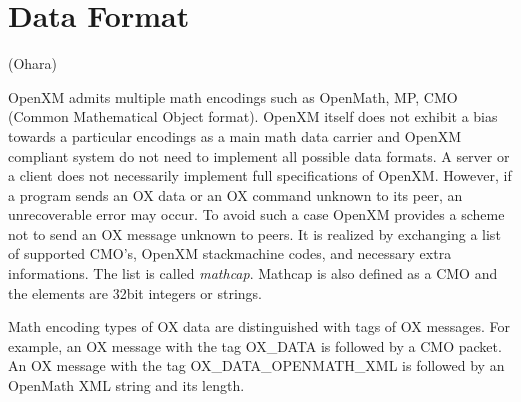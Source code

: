 
\section{Data Format}   (Ohara)

OpenXM admits multiple math encodings such as OpenMath, MP, CMO
(Common Mathematical Object format).
OpenXM itself does not exhibit a bias towards a particular encodings 
as a main math data carrier and OpenXM compliant system do not need to
implement all possible data formats.
A server or a client does not necessarily implement full specifications
of OpenXM. 
However, if a program sends an OX data or an OX command unknown to its peer, 
an unrecoverable error may occur. 
To avoid such a case OpenXM provides a scheme not
to send an OX message unknown to peers. 
It is realized by exchanging a list of
supported CMO's, OpenXM stackmachine codes, and necessary extra informations. 
The list is called {\it mathcap}.
Mathcap is also defined as a CMO and the elements are 32bit integers
or strings.

Math encoding types of OX data are distinguished with tags
of OX messages.
For example,
an OX message with the tag 
OX\_DATA is followed by a CMO packet.
An OX message with the tag 
OX\_DATA\_OPENMATH\_XML is followed by 
an OpenMath XML string and its length.

